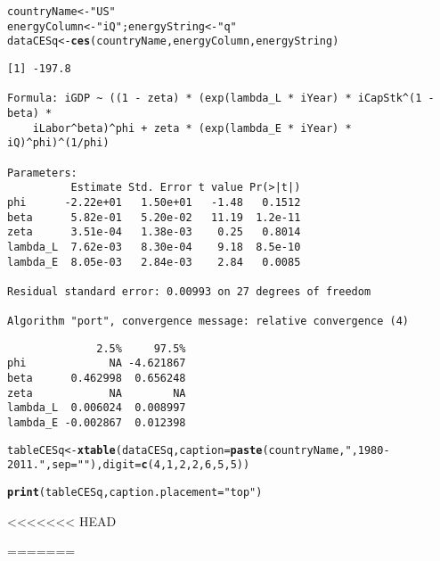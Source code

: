 \documentclass[preprint,authoryear,12pt]{elsarticle}\usepackage{graphicx, color}
\makeatletter
\newcommand{\hlfunctioncall}[1]{\textcolor[rgb]{0.501960784313725,0,0.329411764705882}{\textbf{#1}}}%
\newcommand{\hlstring}[1]{\textcolor[rgb]{0.6,0.6,1}{#1}}%
\newenvironment{kframe}{%
 \def\at@end@of@kframe{}%
 \ifinner\ifhmode%
  \def\at@end@of@kframe{\end{minipage}}%
  \begin{minipage}{\columnwidth}%
 \fi\fi%
 \def\FrameCommand##1{\hskip\@totalleftmargin \hskip-\fboxsep
 \colorbox{shadecolor}{##1}\hskip-\fboxsep
     \hskip-\linewidth \hskip-\@totalleftmargin \hskip\columnwidth}%
 \MakeFramed {\advance\hsize-\width
   \@totalleftmargin\z@ \linewidth\hsize
   \@setminipage}}%
 {\par\unskip\endMakeFramed%
 \at@end@of@kframe}
\newenvironment{knitrout}{}{} %
\makeatother
\begin{document}
\begin{knitrout}
\color{fgcolor}\begin{kframe}
\begin{alltt}
countryName <- \hlstring{"US"}
energyColumn <- \hlstring{"iQ"}; energyString <- \hlstring{"q"}
dataCESq <- \hlfunctioncall{ces}(countryName, energyColumn, energyString)
\end{alltt}
\begin{verbatim}
[1] -197.8

Formula: iGDP ~ ((1 - zeta) * (exp(lambda_L * iYear) * iCapStk^(1 - beta) * 
    iLabor^beta)^phi + zeta * (exp(lambda_E * iYear) * iQ)^phi)^(1/phi)

Parameters:
          Estimate Std. Error t value Pr(>|t|)
phi      -2.22e+01   1.50e+01   -1.48   0.1512
beta      5.82e-01   5.20e-02   11.19  1.2e-11
zeta      3.51e-04   1.38e-03    0.25   0.8014
lambda_L  7.62e-03   8.30e-04    9.18  8.5e-10
lambda_E  8.05e-03   2.84e-03    2.84   0.0085

Residual standard error: 0.00993 on 27 degrees of freedom

Algorithm "port", convergence message: relative convergence (4) 
\end{verbatim}


{\ttfamily\noindent\itshape\color{messagecolor}{Waiting for profiling to be done...}}\begin{verbatim}
              2.5%     97.5%
phi             NA -4.621867
beta      0.462998  0.656248
zeta            NA        NA
lambda_L  0.006024  0.008997
lambda_E -0.002867  0.012398
\end{verbatim}


{\ttfamily\noindent\bfseries\color{errorcolor}{Error: could not find function "deltaMethod"}}\begin{alltt}
tableCESq <- \hlfunctioncall{xtable}(dataCESq, caption=\hlfunctioncall{paste}(countryName, \hlstring{", 1980-2011."}, sep=\hlstring{""}), digit = \hlfunctioncall{c}(4, 1, 2, 2, 6, 5, 5))
\end{alltt}


{\ttfamily\noindent\bfseries\color{errorcolor}{Error: could not find function "xtable"}}\end{kframe}
\end{knitrout}


\begin{kframe}
\begin{alltt}
\hlfunctioncall{print}(tableCESq, caption.placement=\hlstring{"top"})
\end{alltt}

<<<<<<< HEAD

{\ttfamily\noindent\bfseries\color{errorcolor}{Error: error in evaluating the argument 'x' in selecting a method for function 'print': Error: object 'tableCESq' not found}}\end{kframe}
=======
{\ttfamily\noindent\color{warningcolor}{Warning: longer object length is not a multiple of shorter object length}}
\end{document}
